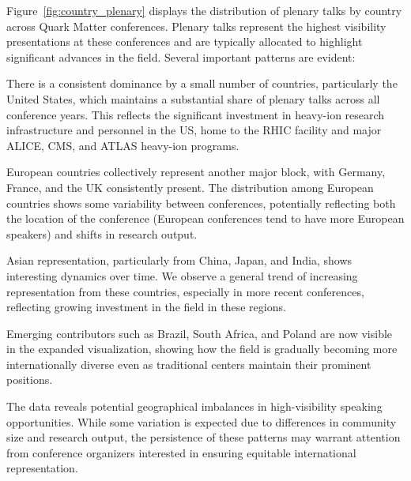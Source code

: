 \documentclass[a4paper,11pt]{article}
\begin{document}
Figure~\ref{fig:country_plenary} displays the distribution of plenary talks by country across Quark Matter conferences. Plenary talks represent the highest visibility presentations at these conferences and are typically allocated to highlight significant advances in the field. Several important patterns are evident:

There is a consistent dominance by a small number of countries, particularly the United States, which maintains a substantial share of plenary talks across all conference years. This reflects the significant investment in heavy-ion research infrastructure and personnel in the US, home to the RHIC facility and major ALICE, CMS, and ATLAS heavy-ion programs.

European countries collectively represent another major block, with Germany, France, and the UK consistently present. The distribution among European countries shows some variability between conferences, potentially reflecting both the location of the conference (European conferences tend to have more European speakers) and shifts in research output.

Asian representation, particularly from China, Japan, and India, shows interesting dynamics over time. We observe a general trend of increasing representation from these countries, especially in more recent conferences, reflecting growing investment in the field in these regions.

Emerging contributors such as Brazil, South Africa, and Poland are now visible in the expanded visualization, showing how the field is gradually becoming more internationally diverse even as traditional centers maintain their prominent positions.

The data reveals potential geographical imbalances in high-visibility speaking opportunities. While some variation is expected due to differences in community size and research output, the persistence of these patterns may warrant attention from conference organizers interested in ensuring equitable international representation.
\end{document}
